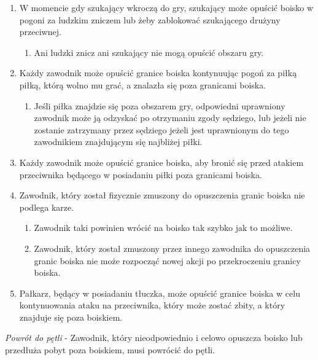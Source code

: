 \documentclass[12pt]{article}
\begin{document}
\begin{enumerate}
	\item
	      W momencie gdy szukający wkroczą do gry, szukający może opuścić boisko
	      w pogoni za ludzkim zniczem lub żeby zablokować szukającego drużyny
	      przeciwnej.

	      \begin{enumerate}
		      \item
		            Ani ludzki znicz ani szukający nie mogą opuścić obszaru gry.
	      \end{enumerate}
	\item
	      Każdy zawodnik może opuścić granice boiska kontynuując pogoń za piłką
	      piłką, którą wolno mu grać, a znalazła się poza granicami boiska.

	      \begin{enumerate}
		      \item
		            Jeśli piłka znajdzie się poza obszarem gry, odpowiedni uprawniony
		            zawodnik może ją odzyskać po otrzymaniu zgody sędziego, lub jeżeli
		            nie zostanie zatrzymany przez sędziego jeżeli jest uprawnionym do
		            tego zawodnikiem znajdującym się najbliżej piłki.
	      \end{enumerate}
	\item
	      Każdy zawodnik może opuścić granice boiska, aby bronić się przed
	      atakiem przeciwnika będącego w posiadaniu piłki poza granicami boiska.
	\item
	      Zawodnik, który został fizycznie zmuszony do opuszczenia granic boiska
	      nie podlega karze.

	      \begin{enumerate}
		      \item
		            Zawodnik taki powinien wrócić na boisko tak szybko jak to możliwe.
		      \item
		            Zawodnik, który został zmuszony przez innego zawodnika do
		            opuszczenia granic boiska nie może rozpocząć nowej akcji po
		            przekroczeniu granicy boiska.
	      \end{enumerate}
	\item
	      Pałkarz, będący w posiadaniu tłuczka, może opuścić granice boiska w
	      celu kontynuowania ataku na przeciwnika, który może zostać zbity, a
	      który znajduje się poza boiskiem.
\end{enumerate}

\emph{Powrót do pętli} - Zawodnik, który nieodpowiednio i celowo opuszcza
boisko lub przedłuża pobyt poza boiskiem, musi powrócić do pętli.
\end{document}
